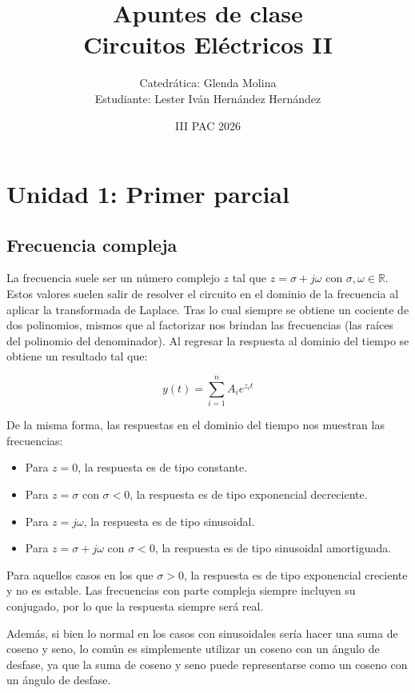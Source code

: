 \documentclass[12pt,letterpaper]{article}
\title{Apuntes de clase\\[0.3em]
	\large Circuitos Eléctricos II}
\author{Catedrática: Glenda Molina\\Estudiante: Lester Iván Hernández Hernández}
\date{III PAC 2026}
\begin{document}
\maketitle

\newpage

\section{Unidad 1: Primer parcial}

\subsection{Frecuencia compleja}

La frecuencia suele ser un número complejo $z$ tal que $z = \sigma + j\omega$ con $\sigma,\omega\in\mathbb{R}$. Estos valores suelen salir de resolver el circuito en el dominio de la frecuencia al aplicar la transformada de Laplace. Tras lo cual siempre se obtiene un cociente de dos polinomios, mismos que al factorizar nos brindan las frecuencias (las raíces del polinomio del denominador). Al regresar la respuesta al dominio del tiempo se obtiene un resultado tal que:

\[
    y(t) = \sum_{i=1}^{n} A_i e^{z_i t}
\]

De la misma forma, las respuestas en el dominio del tiempo nos muestran las frecuencias:

\begin{itemize}
    \item Para $z = 0$, la respuesta es de tipo constante.
    \item Para $z = \sigma$ con $\sigma < 0$, la respuesta es de tipo exponencial decreciente.
    \item Para $z = j\omega$, la respuesta es de tipo sinusoidal.
    \item Para $z = \sigma + j\omega$ con $\sigma < 0$, la respuesta es de tipo sinusoidal amortiguada.
\end{itemize}

Para aquellos casos en los que $\sigma > 0$, la respuesta es de tipo exponencial creciente y no es estable. Las frecuencias con parte compleja siempre incluyen su conjugado, por lo que la respuesta siempre será real.

Además, si bien lo normal en los casos con sinusoidales sería hacer una suma de coseno y seno, lo común es simplemente utilizar un coseno con un ángulo de desfase, ya que la suma de coseno y seno puede representarse como un coseno con un ángulo de desfase.
\end{document}
